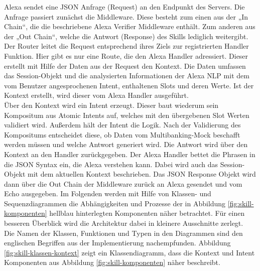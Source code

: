Alexa sendet eine \ac{JSON} Anfrage (Request) an den Endpunkt des Servers. Die Anfrage passiert zunächst die Middleware. Diese besteht zum einen aus der „In Chain“, die \ua die beschriebene Alexa Verifier Middleware enthält. Zum anderen aus der „Out Chain“, welche die Antwort (Response) des Skills lediglich weitergibt. Der Router leitet die Request entsprechend ihres Ziels zur registrierten Handler Funktion. Hier gibt es nur eine Route, die den Alexa Handler adressiert. Dieser erstellt mit Hilfe der Daten aus der Request den Kontext. Die Daten umfassen \ua das Session-Objekt und die analysierten Informationen der Alexa \ac{NLP} mit dem vom Benutzer angesprochenen Intent, enthaltenen Slots und deren Werte. Ist der Kontext erstellt, wird dieser vom Alexa Handler ausgeführt.\\
Über den Kontext wird ein Intent erzeugt. Dieser baut wiederum sein Kompositum aus Atomic Intents auf, welches mit den übergebenen Slot Werten validiert wird. Außerdem hält der Intent die Logik. Nach der Validierung des Kompositums entscheidet diese, ob Daten vom Multibanking-Mock beschafft werden müssen und welche Antwort generiert wird. Die Antwort wird über den Kontext an den Handler zurückgegeben. Der Alexa Handler bettet die Phrasen in die \ac{JSON} Syntax ein, die Alexa verstehen kann. Dabei wird auch das Session-Objekt mit dem aktuellen Kontext beschrieben. Das \ac{JSON} Response Objekt wird dann über die Out Chain der Middleware zurück an Alexa gesendet und vom Echo ausgegeben. Im Folgenden werden mit Hilfe von Klassen- und Sequenzdiagrammen die Abhängigkeiten und Prozesse der in Abbildung \ref{fig:skill-komponenten} hellblau hinterlegten Komponenten näher betrachtet. Für einen besseren Überblick wird die Architektur dabei in kleinere Ausschnitte zerlegt.\\
Die Namen der Klassen, Funktionen und Typen in den Diagrammen sind den englischen Begriffen aus der Implementierung nachempfunden. Abbildung \ref{fig:skill-klassen-kontext} zeigt ein Klassendiagramm, dass die Kontext und Intent Komponenten aus Abbildung \ref{fig:skill-komponenten} näher beschreibt. 

